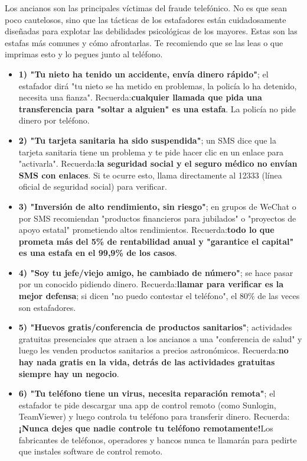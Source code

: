 
Los ancianos son las principales víctimas del fraude telefónico. No es que sean poco cautelosos, sino que las tácticas de los estafadores están cuidadosamente diseñadas para explotar las debilidades psicológicas de los mayores. Estas son las estafas más comunes y cómo afrontarlas. Te recomiendo que se las leas o que imprimas esto y lo pegues junto al teléfono.


\begin{itemize}
  \item \textbf{1) "Tu nieto ha tenido un accidente, envía dinero rápido"}; el estafador dirá "tu nieto se ha metido en problemas, la policía lo ha detenido, necesita una fianza". Recuerda:\textbf{cualquier llamada que pida una transferencia para "soltar a alguien" es una estafa}. La policía no pide dinero por teléfono.
  \item \textbf{2) "Tu tarjeta sanitaria ha sido suspendida"}; un SMS dice que la tarjeta sanitaria tiene un problema y te pide hacer clic en un enlace para "activarla". Recuerda:\textbf{la seguridad social y el seguro médico no envían SMS con enlaces}. Si te ocurre esto, llama directamente al 12333 (línea oficial de seguridad social) para verificar.
  \item \textbf{3) "Inversión de alto rendimiento, sin riesgo"}; en grupos de WeChat o por SMS recomiendan "productos financieros para jubilados" o "proyectos de apoyo estatal" prometiendo altos rendimientos. Recuerda:\textbf{todo lo que prometa más del 5\% de rentabilidad anual y "garantice el capital" es una estafa en el 99,9\% de los casos}.
  \item \textbf{4) "Soy tu jefe/viejo amigo, he cambiado de número"}; se hace pasar por un conocido pidiendo dinero. Recuerda:\textbf{llamar para verificar es la mejor defensa}; si dicen "no puedo contestar el teléfono", el 80\% de las veces son estafadores.
  \item \textbf{5) "Huevos gratis/conferencia de productos sanitarios"}; actividades gratuitas presenciales que atraen a los ancianos a una "conferencia de salud" y luego les venden productos sanitarios a precios astronómicos. Recuerda:\textbf{no hay nada gratis en la vida, detrás de las actividades gratuitas siempre hay un negocio}.
  \item \textbf{6) "Tu teléfono tiene un virus, necesita reparación remota"}; el estafador te pide descargar una app de control remoto (como Sunlogin, TeamViewer) y luego controla tu teléfono para transferir dinero. Recuerda:\textbf{¡Nunca dejes que nadie controle tu teléfono remotamente!}Los fabricantes de teléfonos, operadores y bancos nunca te llamarán para pedirte que instales software de control remoto.
\end{itemize}

